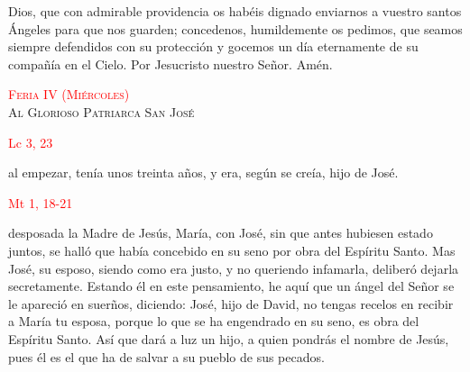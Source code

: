 \documentclass[10pt]{article}
\begin{document}
\begin{multicols}{2}
      \begin{otherlanguage}{latin}
            

            \vspace{1mm}

            

            \vspace{1mm}

            
      \end{otherlanguage}

      \vspace{2mm}

      Dios, que con admirable providencia os habéis dignado enviarnos a vuestro santos Ángeles para que nos guarden; concedenos, humildemente os pedimos,
      que seamos siempre defendidos con su protección y gocemos un día eternamente de su compañía en el Cielo. Por Jesucristo nuestro Señor. Amén.


      \begin{center}
            \textsc{\textcolor{red}{Feria IV (Miércoles)}\\ {\large Al Glorioso Patriarca San José}}
      \end{center}

      \hfill\textcolor{red}{Lc 3, 23}

      al empezar, tenía unos treinta años, y era, según se creía, hijo de José.

      \vspace{2mm}

      \hfill\textcolor{red}{Mt 1, 18-21}

      desposada la Madre de Jesús, María, con José, sin que antes hubiesen estado juntos, se halló que había concebido en su seno por obra del Espíritu Santo. Mas José, su esposo,
      siendo como era justo, y no queriendo infamarla, deliberó dejarla secretamente. Estando él en este pensamiento, he aquí que un ángel del Señor se le apareció en suerños, diciendo:
      José, hijo de David, no tengas recelos en recibir a María tu esposa, porque lo que se ha engendrado en su seno, es obra del Espíritu Santo. Así que dará a luz un hijo, a quien pondrás
      el nombre de Jesús, pues él es el que ha de salvar a su pueblo de sus pecados.
      \vspace{2mm}


\end{multicols}
\end{document}
